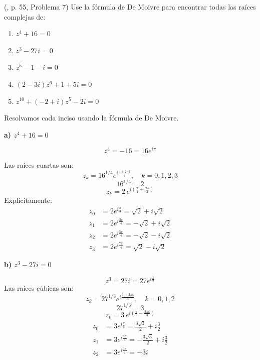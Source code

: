 \begin{prob}  (\cite{andreescu2014complex}, p. 55, Problema 7) Use la fórmula de De Moivre para encontrar todas las raíces complejas de:
\begin{multicols}{2}
\begin{enumerate}[$a)$]
\item $z^4+16=0$
\item $z^3-27i=0$
\item $z^5-1-i=0$
\item $(2-3i)z^6+1+5i=0$
\item $z^{10}+(-2+i)z^5-2i=0$
\end{enumerate}
\end{multicols}
\begin{myproof}
Resolvamos cada inciso usando la fórmula de De Moivre.

\textbf{a) $z^4 + 16 = 0$}

\[
z^4 = -16 = 16 e^{i\pi}
\]

Las raíces cuartas son:
\[
z_k = 16^{1/4} e^{i \frac{\pi + 2\pi k}{4}}, \quad k = 0,1,2,3
\]
\[
16^{1/4} = 2
\]
\[
z_k = 2\, e^{i \left( \frac{\pi}{4} + \frac{\pi k}{2} \right ) }
\]
Explícitamente:
\[
\boxed{
\begin{aligned}
z_0 &= 2 e^{i\frac{\pi}{4}} = \sqrt{2} + i\sqrt{2} \\
z_1 &= 2 e^{i\frac{3\pi}{4}} = -\sqrt{2} + i\sqrt{2} \\
z_2 &= 2 e^{i\frac{5\pi}{4}} = -\sqrt{2} - i\sqrt{2} \\
z_3 &= 2 e^{i\frac{7\pi}{4}} = \sqrt{2} - i\sqrt{2}
\end{aligned}
}
\]

\vspace{1em}

\textbf{b) $z^3 - 27i = 0$}

\[
z^3 = 27i = 27 e^{i\frac{\pi}{2}}
\]
Las raíces cúbicas son:
\[
z_k = 27^{1/3} e^{i \frac{\frac{\pi}{2} + 2\pi k}{3}}, \quad k=0,1,2
\]
\[
27^{1/3} = 3
\]
\[
z_k = 3\, e^{i \left( \frac{\pi}{6} + \frac{2\pi k}{3} \right )}
\]
\[
\boxed{
\begin{aligned}
z_0 &= 3 e^{i\frac{\pi}{6}} = \frac{3\sqrt{3}}{2} + i\frac{3}{2} \\
z_1 &= 3 e^{i\frac{5\pi}{6}} = -\frac{3\sqrt{3}}{2} + i\frac{3}{2} \\
z_2 &= 3 e^{i\frac{3\pi}{2}} = -3i
\end{aligned}
}
\]

\vspace{1em}


\end{myproof}
\end{prob}
